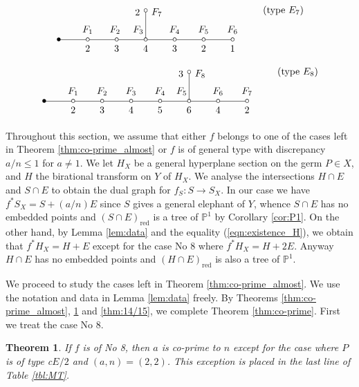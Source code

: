 \documentclass[a4paper,11pt]{amsart}
\newtheorem{theorem}{Theorem}[section]
\theoremstyle{definition}
\theoremstyle{remark}
\numberwithin{equation}{section}
\newcommand{\bP}{{\mathbb P}}
\newcommand{\red}{\mathrm{red}}
\begin{document}
\begin{align}
\xymatrix@!0@=30pt{
&
&
&
*=<3.5pt>{\circ} \ar@{-}[d]^<*+{F_7}_<*+{2} &
&
&
\\
*=<3.5pt>{\bullet} \ar@{-}[r]^>*+{\ F_1}_>*+{\ 2} &
*=<3.5pt>{\circ} \ar@{-}[r]^>*+{F_2}_>*+{\ 3} &
*=<3.5pt>{\circ} \ar@{-}[r]^>>>*+{F_3}_>*+{\ 4} &
*=<3.5pt>{\circ} \ar@{-}[r]^>*+{\ F_4}_>*+{\ 3} & 
*=<3.5pt>{\circ} \ar@{-}[r]^>*+{\ F_5}_>*+{\ 2} &
*=<3.5pt>{\circ} \ar@{-}[r]^>*+{\ F_6}_>*+{\ 1} &
*=<3.5pt>{\circ}
}\tag{type $E_7$}
\end{align}
\begin{align}
\xymatrix@!0@=30pt{
&
&
&
&
&
*=<3.5pt>{\circ} \ar@{-}[d]^<*+{F_8}_<*+{3} &
&
\\
*=<3.5pt>{\bullet} \ar@{-}[r]^>*+{\ F_1}_>*+{\ 2} &
*=<3.5pt>{\circ} \ar@{-}[r]^>*+{\ F_2}_>*+{\ 3} &
*=<3.5pt>{\circ} \ar@{-}[r]^>*+{\ F_3}_>*+{\ 4} &
*=<3.5pt>{\circ} \ar@{-}[r]^>*+{\ F_4}_>*+{\ 5} &
*=<3.5pt>{\circ} \ar@{-}[r]^>>>*+{F_5}_>*+{\ 6} &
*=<3.5pt>{\circ} \ar@{-}[r]^>*+{\ F_6}_>*+{\ 4} & 
*=<3.5pt>{\circ} \ar@{-}[r]^>*+{\ F_7}_>*+{\ 2} &
*=<3.5pt>{\circ}
}\tag{type $E_8$}
\end{align}

Throughout this section,
we assume that either
$f$ belongs to one of the cases left in Theorem \ref{thm:co-prime_almost}
or $f$ is of general type with discrepancy $a/n\le1$ for $a\neq1$.
We let $H_X$ be a general hyperplane section on the germ $P \in X$,
and $H$ the birational transform on $Y$ of $H_X$.
We analyse the intersections $H \cap E$ and $S \cap E$
to obtain the dual graph for $f_S \colon S \to S_X$.
In our case we have $f^*S_X=S+(a/n)E$
since $S$ gives a general elephant of $Y$,
whence $S \cap E$ has no embedded points
and $(S \cap E)_\red$ is a tree of $\bP^1$ by Corollary \ref{cor:P1}.
On the other hand,
by Lemma \ref{lem:data} and the equality (\ref{eqn:existence_H}),
we obtain that $f^*H_X=H+E$ except for the case No 8 where $f^*H_X=H+2E$.
Anyway $H \cap E$ has no embedded points
and $(H \cap E)_\red$ is also a tree of $\bP^1$.

We proceed to study the cases left in Theorem \ref{thm:co-prime_almost}.
We use the notation and data in Lemma \ref{lem:data} freely.
By Theorems \ref{thm:co-prime_almost},
\ref{thm:co-prime_8} and \ref{thm:14/15},
we complete Theorem \ref{thm:co-prime}.
First we treat the case No 8.

\begin{theorem}\label{thm:co-prime_8}
If $f$ is of No 8,
then $a$ is co-prime to $n$
except for the case where $P$ is of type c$E/2$ and $(a,n)=(2,2)$.
This exception is placed in the last line of Table \textup{\ref{tbl:MT}}.
\end{theorem}
\end{document}
